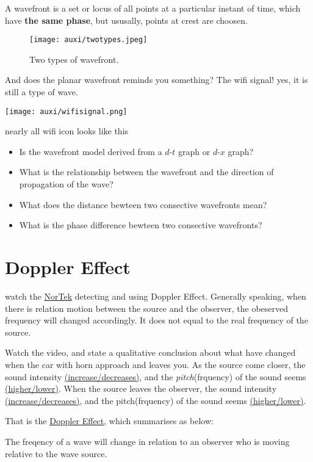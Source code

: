 \documentclass[a4paper]{tufte-handout}
\newenvironment{TaskBox} %
{\begin{tcolorbox}[breakable,colback=b1!30,colframe=b1,title=Task]} {\end{tcolorbox}}
\newenvironment{ExampleBox} %
{\begin{tcolorbox}[breakable,colback=g1!30,colframe=g1,title=Example]} {\end{tcolorbox}}
\newenvironment{SummBox}
{\begin{tcolorbox}[breakable,colback=r1!30,colframe=r1,title=Summary]} {\end{tcolorbox}}
\begin{document}
A wavefront is a set or locus of all points at a particular instant of time, which have \textbf{the same phase}, but ususally, points at crest are choosen.
\begin{figure}[h]
\centering
\texttt{[image: auxi/twotypes.jpeg]}
\caption{Two types of wavefront.}
\end{figure}

And does the planar wavefront reminds you something? The wifi signal! yes, it is still a type of wave.
\begin{marginfigure}
\texttt{[image: auxi/wifisignal.png]}
\caption{nearly all wifi icon looks like this}
\end{marginfigure}

\begin{ExampleBox}
\begin{itemize}
  \item Is the wavefront model derived from a $d$-$t$ graph or $d$-$x$ graph?\\
  \uline{\hfill}
  \item What is the relationship between the wavefront and the direction of propagation of the wave?\\
  \uline{\hfill}
  \item What does the distance bewteen two consective wavefronts mean?\\
  \uline{\hfill}
  \item What is the phase difference bewteen two consective wavefronts?\\
\end{itemize}
\end{ExampleBox}

\section{Doppler Effect}
watch the \href{https://www.youtube.com/watch?v=1yECQ_kNwwM}{NorTek} detecting and using Doppler Effect. Generally speaking, when there is relation motion between the source and the observer, the obeserved frequency will changed accordingly. It does not equal to the real frequency of the source. 

\begin{TaskBox}
Watch the video, and state a qualitative conclusion about what have changed when the car with horn approach and leaves you.
\tcblower
As the source come closer, the sound intensity \uline{(increase/decreases)}, and the \emph{pitch}(frquency) of the sound seems \uline{(higher/lower)}.
When the source leaves the observer, the sound intensity \uline{(increase/decreases)}, and the pitch(frquency) of the sound seems \uline{(higher/lower)}.
\end{TaskBox}
That is the \uline{Doppler Effect}, which summarises as below:
\begin{SummBox}
The freqency of a wave will change in relation to an observer who is moving relative to the wave source. 
\end{SummBox}
\end{document}
